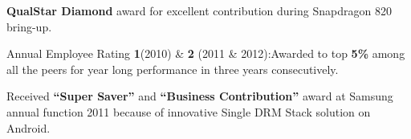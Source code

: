 

\begin{cventries}
	\cventry
	{}
	{}
	{}
	{}
	{
		\begin{cvitems}
		\item{\textbf{QualStar Diamond} award for excellent contribution during Snapdragon 820 bring-up.}
		\item{Annual Employee Rating \textbf{1}(2010) \& \textbf{2} (2011 \& 2012):Awarded to top \textbf{5\%} among all the peers for year long performance in three years consecutively.}
		\item{Received \textbf{“Super Saver”} and \textbf{“Business Contribution”} award at Samsung annual function 2011 because of innovative Single DRM Stack solution on Android.}
		\end{cvitems}
	}
\end{cventries}

